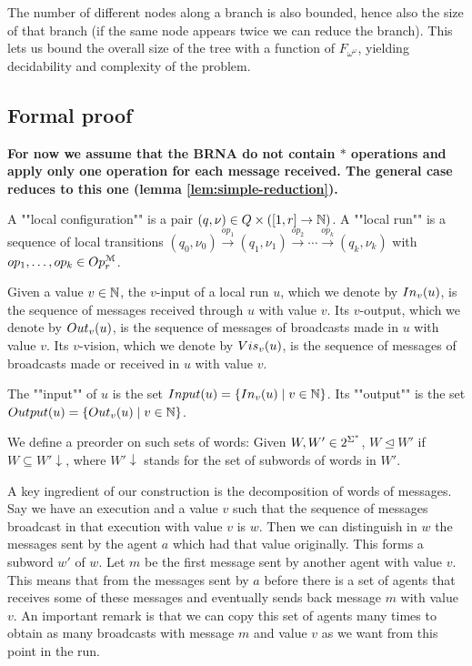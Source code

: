  The number of different nodes along a branch is also bounded, hence also the size of that branch (if the same node appears twice we can reduce the branch).
 This lets us bound the overall size of the tree with a function of $F_{\omega^\omega}$, yielding decidability and complexity of the problem.

\subsection{Formal proof}
\fi


\textbf{For now we assume that the BRNA do not contain $*$ operations and apply only one operation for each message received. The general case reduces to this one (lemma \ref{lem:simple-reduction}).}

\begin{definition}
	A ""local configuration"" is a pair $(q, \nu) \in Q \times ([1,r] \to \mathbb{N})$.
	A ""local run"" is a sequence of local transitions $(q_0, \nu_0) \xrightarrow{op_1} (q_1, \nu_1) \xrightarrow{op_2} \cdots \xrightarrow{op_k} (q_k, \nu_k)$ with $op_1, \ldots, op_k \in Op_r^{\mathcal{M}}$. 
	
	Given a value $v \in \mathbb{N}$, the $v$-input of a local run $u$, which we denote by $In_{v}(u)$, is the sequence of messages received through $u$ with value $v$.
	Its $v$-output, which we denote by $Out_{v}(u)$, is the sequence of messages of broadcasts made in $u$ with value $v$. 
	Its $v$-vision, which we denote by $Vis_{v}(u)$, is the sequence of messages of broadcasts made or received in $u$ with value $v$.
	
	The ""input"" of $u$ is the set $Input(u) = \{In_{v}(u) \mid v \in \mathbb{N}\}$.
	Its ""output"" is the set $Output(u)=\{Out_{v}(u) \mid v \in \mathbb{N}\}$.
	
	We define a preorder on such sets of words:
	Given $W, W' \in 2^{\Sigma^*}$, $W \unlhd W'$ if $W \subseteq W'\downarrow$, where $W'\downarrow$ stands for the set of subwords of words in $W'$.
\end{definition}

A key ingredient of our construction is the decomposition of words of messages. Say we have an execution and a value $v$ such that the sequence of messages broadcast in that execution with value $v$ is $w$. Then we can distinguish in $w$ the messages sent by the agent $a$ which had that value originally. This forms a subword $w'$ of $w$. Let $m$ be the first message sent by another agent with value $v$. This means that from the messages sent by $a$ before there is a set of agents that receives some of these messages and eventually sends back message $m$ with value $v$. An important remark is that we can copy this set of agents many times to obtain as many broadcasts with message $m$ and value $v$ as we want from this point in the run.

